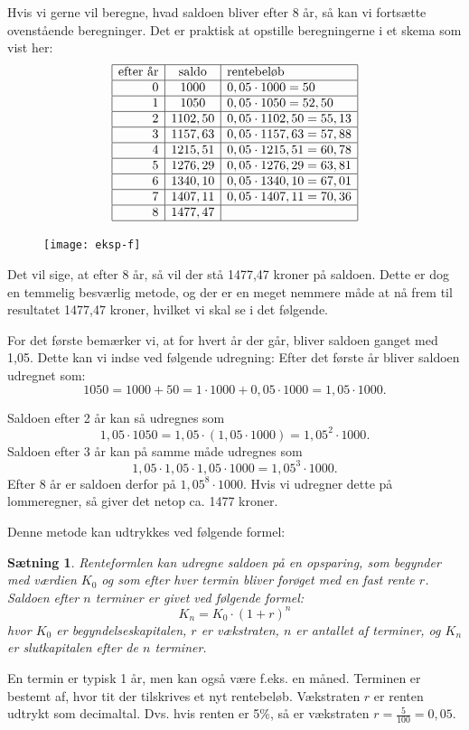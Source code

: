 \documentclass[12pt,oneside,a4paper]{article}
\theoremstyle{plain}
\newtheorem*{thm}{Sætning}
\begin{document}
Hvis vi gerne vil beregne, hvad saldoen bliver efter 8 år, så kan vi fortsætte
ovenstående beregninger. Det er praktisk at opstille beregningerne i et skema
som vist her:
$$
\begin{array}{|r|c|l|}
    \hline
    \mbox{efter år} & \mbox{saldo} & \mbox{rentebeløb} \\
    \hline
0 & 1000 & 0,05\cdot 1000 = 50 \\
    \hline
1 & 1050 & 0,05\cdot 1050 = 52,50 \\
    \hline
2 & 1102,50 & 0,05\cdot 1102,50 = 55,13 \\
    \hline
3 & 1157,63 & 0,05\cdot 1157,63 = 57,88 \\
    \hline
4 & 1215,51 & 0,05\cdot 1215,51 = 60,78 \\
    \hline
5 & 1276,29 & 0,05\cdot 1276,29 = 63,81 \\
    \hline
6 & 1340,10 & 0,05\cdot 1340,10 = 67,01 \\
    \hline
7 & 1407,11 & 0,05\cdot 1407,11 = 70,36 \\
    \hline
8 & 1477,47 & \\
\hline
\end{array}
$$
\begin{figure}[ht]
    \centering
    \texttt{[image: eksp-f]}
    \label{eksp-f}
\end{figure}
Det vil sige, at efter 8 år, så vil der stå 1477,47 kroner på saldoen.  Dette
er dog en temmelig besværlig metode, og der er en meget nemmere måde at nå frem
til resultatet 1477,47 kroner, hvilket vi skal se i det følgende.

For det første bemærker vi, at for hvert år der går, bliver saldoen ganget med
1,05. Dette kan vi indse ved følgende udregning: Efter det første år bliver
saldoen udregnet som:
$$
1050 = 1000 + 50 = 1\cdot 1000 + 0,05\cdot 1000 = 1,05 \cdot 1000.
$$

Saldoen efter 2 år kan så udregnes som
$$
1,05\cdot 1050 = 1,05 \cdot (1,05 \cdot 1000) = 1,05^2 \cdot 1000.
$$
Saldoen efter 3 år kan på samme måde udregnes som
$$
1,05\cdot1,05\cdot1,05\cdot 1000 = 1,05^3 \cdot 1000.
$$
Efter 8 år er saldoen
derfor på $1,05^8\cdot 1000$. Hvis vi udregner dette på lommeregner, så giver
det netop ca. 1477 kroner.

Denne metode kan udtrykkes ved følgende formel:
\begin{thm}
    {\em Renteformlen} kan udregne saldoen på en opsparing, som begynder med
    værdien $K_0$ og som efter hver {\em termin} bliver forøget med en fast
    rente $r$. Saldoen efter $n$ terminer er givet ved følgende formel:
    $$
    K_n = K_0 \cdot (1+r)^n
    $$
    hvor $K_0$ er {\em begyndelseskapitalen}, $r$ er {\em vækstraten}, $n$ er antallet af
    terminer, og $K_n$ er {\em slutkapitalen} efter de $n$ terminer.
\end{thm}
En termin er typisk 1 år, men kan også være f.eks. en måned. Terminen er bestemt af,
hvor tit der tilskrives et nyt rentebeløb. Vækstraten $r$ er renten udtrykt som
decimaltal. Dvs. hvis renten er 5\%, så er vækstraten $r=\frac{5}{100}=0,05$.
\end{document}

